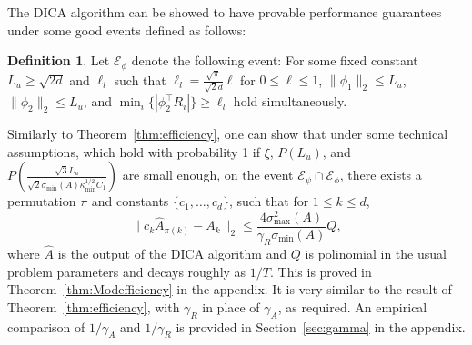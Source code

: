 \documentclass{article}
\newcommand{\Epsi}{\mathcal{E}_{\psi}}
\newcommand{\Ephi}{\mathcal{E}_{\phi}}
\theoremstyle{definition}
\newtheorem{definition}[lemma]{Definition}
\newtheorem{remark}[lemma]{Remark}
\begin{document}
The DICA algorithm can be showed to have provable performance guarantees under some good events defined as follows:
\begin{definition}
Let $\Ephi$ denote the following event:
For some fixed constant $L_u \ge \sqrt{2d}$ and $\ell_l$ such that $\ell_l = \frac{\sqrt{\pi}}{\sqrt{2}d}\ell$ for $0\le \ell\le 1$,
$\|\phi_1\|_2 \le L_u$, $\|\phi_2\|_2 \le L_u$, and $\min_i \{|\phi_2^{\top}R_i|\} \ge \ell_l$ hold simultaneously.
\end{definition}  
Similarly to Theorem~\ref{thm:efficiency}, one can show that under some technical assumptions, which 
hold with probability 1 if $\xi$, $P(L_u)$, and $P\left(\frac{\sqrt{3}L_u}{\sqrt{2}\sigma_{\min}(A)\kappa_{\min}^{1/2}C_1}\right)$  are small enough,
on the event $\Epsi \cap\Ephi$,  there exists a permutation $\pi$ and constants $\{c_1,\ldots,c_d\}$, such that for $1\le k\le d$,
\[
\| c_k\hat{A}_{\pi(k)} - A_k\|_2 \le \frac{4\sigma^2_{\max}(A)}{\gamma_R\sigma_{\min}(A)} Q,
\]
where $\hat{A}$ is the output of the DICA algorithm and $Q$ is polinomial in the usual problem parameters and decays roughly as $1/T$. This is proved in Theorem~\ref{thm:Modefficiency} in the appendix.
It is very similar to the result of Theorem~\ref{thm:efficiency}, with $\gamma_R$ in place of $\gamma_A$, as required.
An empirical comparison of $1/\gamma_A$ and $1/\gamma_R$ is provided in Section~\ref{sec:gamma} in the appendix.
\end{document}

